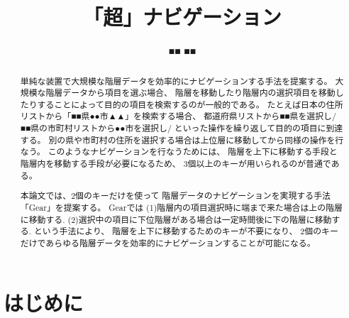 \documentclass[twoside]{wiss}
\def\GEAR{\textsf{Gear}}
\begin{document}
\title{「超」ナビゲーション}
\etitle{} %

\author{■■ ■■}

\begin{abstract}
単純な装置で大規模な階層データを効率的にナビゲーションする手法を提案する。
%
大規模な階層データから項目を選ぶ場合、
階層を移動したり階層内の選択項目を移動したりすることによって目的の項目を検索するのが一般的である。
たとえば日本の住所リストから「■■県●●市▲▲」を検索する場合、
都道府県リストから■■県を選択し/■■県の市町村リストから●●市を選択し/
といった操作を繰り返して目的の項目に到達する。
別の県や市町村の住所を選択する場合は上位層に移動してから同様の操作を行なう。
%
このようなナビゲーションを行なうためには、
階層を上下に移動する手段と階層内を移動する手段が必要になるため、
3個以上のキーが用いられるのが普通である。

本論文では、2個のキーだけを使って
階層データのナビゲーションを実現する手法「{\GEAR}」を提案する。
{\GEAR}では
(1)階層内の項目選択時に端まで来た場合は上の階層に移動する.
(2)選択中の項目に下位階層がある場合は一定時間後に下の階層に移動する.
という手法により、
階層を上下に移動するためのキーが不要になり、
2個のキーだけであらゆる階層データを効率的にナビゲーションすることが可能になる。
\end{abstract}

\maketitle

\section{はじめに}

\end{document}
